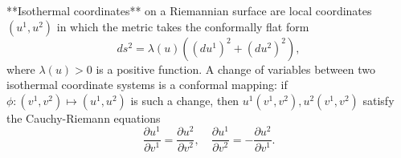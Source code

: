 **Isothermal coordinates** on a Riemannian surface are local coordinates $(u^1, u^2)$ in which the metric takes the conformally flat form
$$ds^2 = \lambda(u)((du^1)^2 + (du^2)^2),$$
where $\lambda(u) > 0$ is a positive function. A change of variables between two isothermal coordinate systems is a conformal mapping: if $\phi: (v^1, v^2) \mapsto (u^1, u^2)$ is such a change, then $u^1(v^1, v^2), u^2(v^1, v^2)$ satisfy the Cauchy-Riemann equations
$$\frac{\partial u^1}{\partial v^1} = \frac{\partial u^2}{\partial v^2}, \quad \frac{\partial u^1}{\partial v^2} = -\frac{\partial u^2}{\partial v^1}.$$